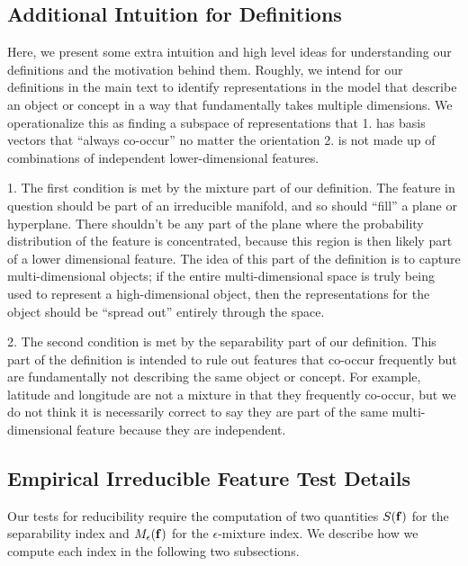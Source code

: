 \documentclass{article} %
\theoremstyle{plain}
\theoremstyle{definition}
\begin{document}
\subsection{Additional Intuition for Definitions}

Here, we present some extra intuition and high level ideas for understanding our definitions and the motivation behind them. Roughly, we intend for our definitions in the main text to identify representations in the model that describe an object or concept in a way that fundamentally takes multiple dimensions. We operationalize this as finding a subspace of representations that 1. has basis vectors that ``always co-occur'' no matter the orientation 2. is not made up of combinations of independent lower-dimensional features. 

1. The first condition is met by the mixture part of our definition. The feature in question should  be part of an irreducible manifold, and so should ``fill'' a plane or hyperplane. There shouldn't be any part of the plane where the probability distribution of the feature is concentrated, because this region is then likely part of a lower dimensional feature. The idea of this part of the definition is to capture multi-dimensional objects; if the entire multi-dimensional space is truly being used to represent a high-dimensional object, then the representations for the object should be ``spread out'' entirely through the space. 

2. The second condition is met by the separability part of our definition. This part of the definition is intended to rule out features that co-occur frequently but are fundamentally not describing the same object or concept. For example, latitude and longitude are not a mixture in that they frequently co-occur, but we do not think it is necessarily correct to say they are part of the same multi-dimensional feature because they are independent. 

\subsection{Empirical Irreducible Feature Test Details}
\label{sec:empirical_test_details}

Our tests for reducibility require the computation of two quantities $S({\mathbf f})$ for the separability index and $M_\epsilon({\mathbf f})$ for the $\epsilon$-mixture index. We describe how we compute each index in the following two subsections.
\end{document}
